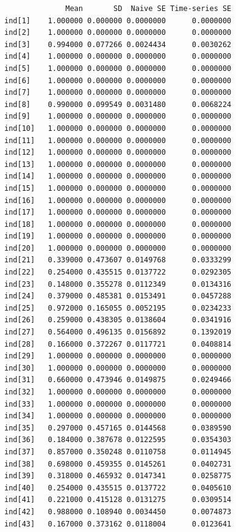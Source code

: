 \documentclass{article}
\begin{document}
\begin{verbatim}
              Mean       SD  Naive SE Time-series SE
ind[1]    1.000000 0.000000 0.0000000      0.0000000
ind[2]    1.000000 0.000000 0.0000000      0.0000000
ind[3]    0.994000 0.077266 0.0024434      0.0030262
ind[4]    1.000000 0.000000 0.0000000      0.0000000
ind[5]    1.000000 0.000000 0.0000000      0.0000000
ind[6]    1.000000 0.000000 0.0000000      0.0000000
ind[7]    1.000000 0.000000 0.0000000      0.0000000
ind[8]    0.990000 0.099549 0.0031480      0.0068224
ind[9]    1.000000 0.000000 0.0000000      0.0000000
ind[10]   1.000000 0.000000 0.0000000      0.0000000
ind[11]   1.000000 0.000000 0.0000000      0.0000000
ind[12]   1.000000 0.000000 0.0000000      0.0000000
ind[13]   1.000000 0.000000 0.0000000      0.0000000
ind[14]   1.000000 0.000000 0.0000000      0.0000000
ind[15]   1.000000 0.000000 0.0000000      0.0000000
ind[16]   1.000000 0.000000 0.0000000      0.0000000
ind[17]   1.000000 0.000000 0.0000000      0.0000000
ind[18]   1.000000 0.000000 0.0000000      0.0000000
ind[19]   1.000000 0.000000 0.0000000      0.0000000
ind[20]   1.000000 0.000000 0.0000000      0.0000000
ind[21]   0.339000 0.473607 0.0149768      0.0333299
ind[22]   0.254000 0.435515 0.0137722      0.0292305
ind[23]   0.148000 0.355278 0.0112349      0.0134316
ind[24]   0.379000 0.485381 0.0153491      0.0457288
ind[25]   0.972000 0.165055 0.0052195      0.0234233
ind[26]   0.259000 0.438305 0.0138604      0.0341916
ind[27]   0.564000 0.496135 0.0156892      0.1392019
ind[28]   0.166000 0.372267 0.0117721      0.0408814
ind[29]   1.000000 0.000000 0.0000000      0.0000000
ind[30]   1.000000 0.000000 0.0000000      0.0000000
ind[31]   0.660000 0.473946 0.0149875      0.0249466
ind[32]   1.000000 0.000000 0.0000000      0.0000000
ind[33]   1.000000 0.000000 0.0000000      0.0000000
ind[34]   1.000000 0.000000 0.0000000      0.0000000
ind[35]   0.297000 0.457165 0.0144568      0.0389590
ind[36]   0.184000 0.387678 0.0122595      0.0354303
ind[37]   0.857000 0.350248 0.0110758      0.0114945
ind[38]   0.698000 0.459355 0.0145261      0.0402731
ind[39]   0.318000 0.465932 0.0147341      0.0258775
ind[40]   0.254000 0.435515 0.0137722      0.0405610
ind[41]   0.221000 0.415128 0.0131275      0.0309514
ind[42]   0.988000 0.108940 0.0034450      0.0074873
ind[43]   0.167000 0.373162 0.0118004      0.0123641
\end{verbatim}
\end{document}
